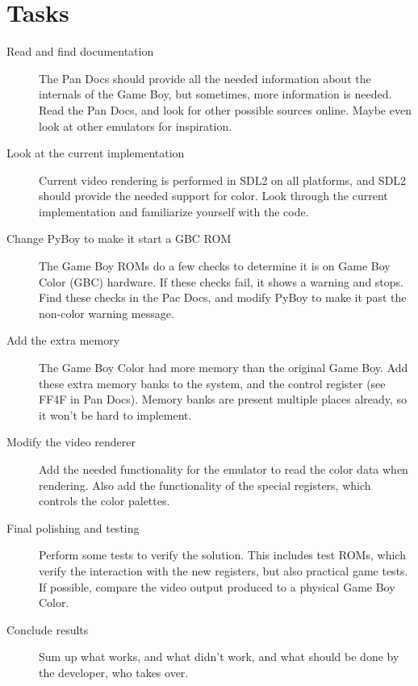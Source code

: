 \documentclass[11pt]{report} %
\begin{document}
\section*{Tasks}
\begin{description}
    \item [Read and find documentation]
        The Pan Docs should provide all the needed information about the internals of the Game Boy, but sometimes, more information is needed. Read the Pan Docs, and look for other possible sources online. Maybe even look at other emulators for inspiration.

    \item [Look at the current implementation]
        Current video rendering is performed in SDL2 on all platforms, and SDL2 should provide the needed support for color. Look through the current implementation and familiarize yourself with the code.

    \item [Change PyBoy to make it start a GBC ROM]
        The Game Boy ROMs do a few checks to determine it is on Game Boy Color (GBC) hardware. If these checks fail, it shows a warning and stops. Find these checks in the Pac Docs, and modify PyBoy to make it past the non-color warning message.

    \item [Add the extra memory]
        The Game Boy Color had more memory than the original Game Boy. Add these extra memory banks to the system, and the control register (see FF4F in Pan Docs). Memory banks are present multiple places already, so it won't be hard to implement.

    \item [Modify the video renderer]
        Add the needed functionality for the emulator to read the color data when rendering. Also add the functionality of the special registers, which controls the color palettes.

    \item [Final polishing and testing]
        Perform some tests to verify the solution. This includes test ROMs, which verify the interaction with the new registers, but also practical game tests. If possible, compare the video output produced to a physical Game Boy Color.

    \item [Conclude results]
        Sum up what works, and what didn't work, and what should be done by the developer, who takes over.

\end{description}
\end{document}
